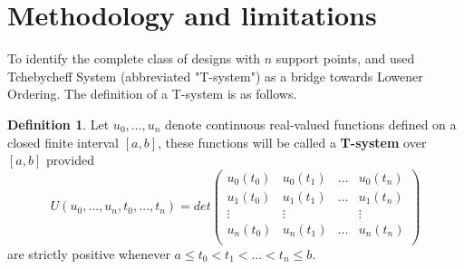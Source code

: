 \documentclass[11pt]{amsart}
\theoremstyle{definition}
\newtheorem{definition}{Definition}[section]
\theoremstyle{remark}
\numberwithin{equation}{section}
\begin{document}
\section{Methodology and limitations} 
To identify the complete class of designs with $n$ support points, \cite{yang2012} and \cite{dette2011} used Tchebycheff System (abbreviated "T-system") as a bridge towards Lowener Ordering. The definition of a T-system is as follows.

\begin{definition}\label{deft}
    Let $u_0, \ldots, u_n$ denote continuous real-valued functions defined on a closed finite interval $[a,b]$, these functions will be called a \textbf{T-system} over $[a,b]$ provided  
\[U(u_0,\ldots,u_n, t_0,\ldots,t_n) = det\left ( \begin{array}{cccc}\label{eq: tdef2}
u_0(t_0) &u_0(t_1) &\ldots &u_0(t_n) \\
u_1(t_0) &u_1(t_1) &\ldots &u_1(t_n) \\
\vdots & \vdots &&\vdots\\
u_n(t_0) &u_n(t_1) &\ldots &u_n(t_n) \\
\end{array}\right)
    \] are strictly positive whenever $a\le t_0 <t_1< \ldots< t_n\le b$.
\end{definition}


\end{document}
